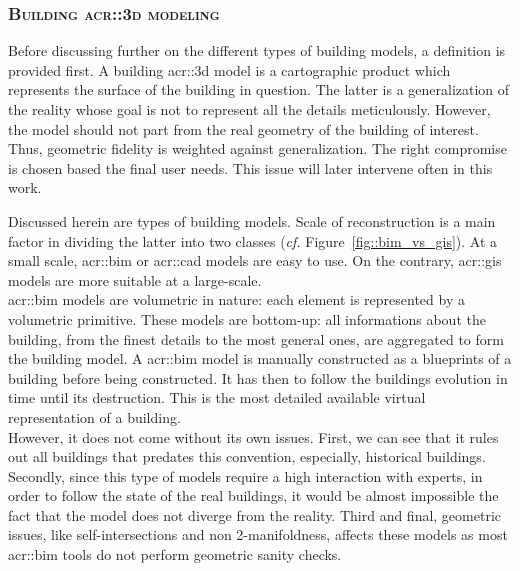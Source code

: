         \subsubsection{\textsc{Building \texorpdfstring{\gls*{acr::3d}}{3D} modeling}}
            Before discussing further on the different types of building models, a definition is provided first.
            A building \gls{acr::3d} model is a cartographic product which represents the surface of the building in question.
            The latter is a generalization of the reality whose goal is not to represent all the details meticulously.
            However, the model should not part from the real geometry of the building of interest.
            Thus, geometric fidelity is weighted against generalization.
            The right compromise is chosen based the final user needs.
            This issue will later intervene often in this work.

            Discussed herein are types of building models.
            Scale of reconstruction is a main factor in dividing the latter into two classes (\textit{cf.} Figure~\ref{fig::bim_vs_gis}).
            At a small scale, \gls{acr::bim} or \gls{acr::cad} models are easy to use.
            On the contrary, \gls{acr::gis} models are more suitable at a large-scale.\\

            \gls{acr::bim} models are volumetric in nature:
            each element is represented by a volumetric primitive.
            These models are bottom-up: all informations about the building, from the finest details to the most general ones, are aggregated to form the building model.
            A \gls{acr::bim} model is manually constructed as a blueprints of a building before being constructed.
            It has then to follow the buildings evolution in time until its destruction.
            This is the most detailed available virtual representation of a building.\\
            However, it does not come without its own issues.
            First, we can see that it rules out all buildings that predates this convention, especially, historical buildings.
            Secondly, since this type of models require a high interaction with experts, in order to follow the state of the real buildings, it would be almost impossible the fact that the model does not diverge from the reality\addref.
            Third and final, geometric issues, like self-intersections and non 2-manifoldness, affects these models as most \gls{acr::bim} tools do not perform geometric sanity checks.\\

